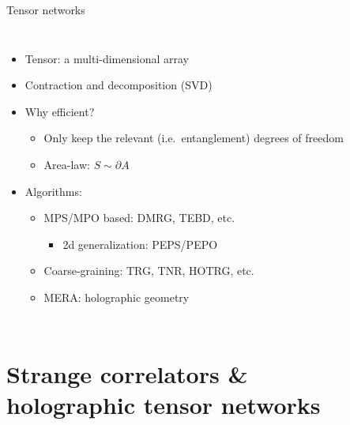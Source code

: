 \documentclass{fdubeamer}
\newcommand{\tikzinput}[1]{}
\newcommand{\1}{\mathbb{1}}
\begin{document}
\begin{frame}{Tensor networks}

\begin{columns}[c]


    \begin{itemize}
      \item Tensor: a multi-dimensional array
      \item Contraction and decomposition (SVD)
      \item Why efficient?

        \begin{itemize}
          \item Only keep the relevant (i.e.\ entanglement) degrees of freedom
          \item Area-law: $S\sim\partial A$
        \end{itemize}

      \item Algorithms:

        \begin{itemize}
          \item MPS/MPO based: DMRG, TEBD, etc.

            \begin{itemize}
              \item 2d generalization: PEPS/PEPO
            \end{itemize}

          \item Coarse-graining: TRG, TNR, HOTRG, etc.
          \item MERA: holographic geometry
        \end{itemize}
    \end{itemize}


    \centering
    \tikzinput{tensor-network/tensor-networks}

\end{columns}


\end{frame}

\section{Strange correlators \& \\ holographic tensor networks}
\end{document}
